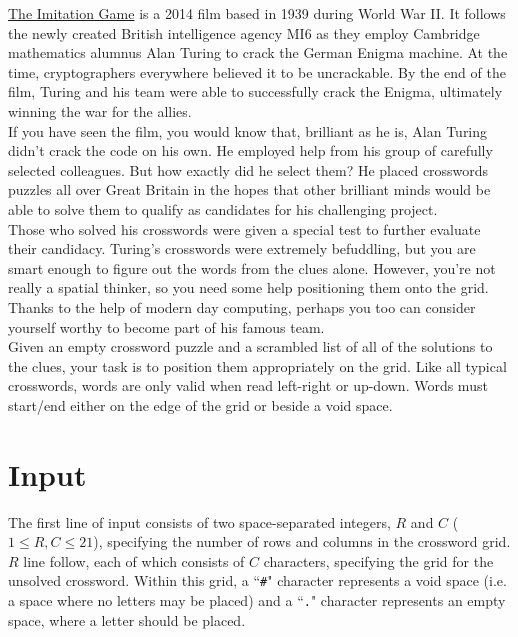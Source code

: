 
\noindent \href{https://www.imdb.com/title/tt2084970/}{The Imitation Game} is a 2014 film based in 1939 during World War II. It follows the newly created British intelligence agency MI6 as they employ Cambridge mathematics alumnus Alan Turing to crack the German Enigma machine. At the time, cryptographers everywhere believed it to be uncrackable. By the end of the film, Turing and his team were able to successfully crack the Enigma, ultimately winning the war for the allies.\\

If you have seen the film, you would know that, brilliant as he is, Alan Turing didn't crack the code on his own. He employed help from his group of carefully selected colleagues. But how exactly did he select them? He placed crosswords puzzles all over Great Britain in the hopes that other brilliant minds would be able to solve them to qualify as candidates for his challenging project.\\

Those who solved his crosswords were given a special test to further evaluate their candidacy. Turing's crosswords were extremely befuddling, but you are smart enough to figure out the words from the clues alone. However, you're not really a spatial thinker, so you need some help positioning them onto the grid. Thanks to the help of modern day computing, perhaps you too can consider yourself worthy to become part of his famous team.\\

Given an empty crossword puzzle and a scrambled list of all of the solutions to the clues, your task is to position them appropriately on the grid. Like all typical crosswords, words are only valid when read left-right or up-down. Words must start/end either on the edge of the grid or beside a void space.

\section*{Input}
The first line of input consists of two space-separated integers, $R$ and $C$ ($1 \leq R, C \leq 21$), specifying the number of rows and columns in the crossword grid.\\

\noindent $R$ line follow, each of which consists of $C$ characters, specifying the grid for the unsolved crossword. Within this grid, a ``\texttt{\#}" character represents a void space (i.e. a space where no letters may be placed) and a ``\texttt{.}" character represents an empty space, where a letter should be placed.\\

